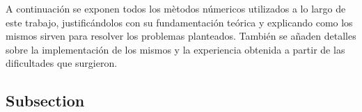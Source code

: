 \par A continuaci\'on se exponen todos los m\`etodos n\'umericos utilizados a
lo largo de este trabajo, justific\'andolos con su fundamentaci\'on te\'orica y
explicando como los mismos sirven para resolver los problemas planteados.
Tambi\'en se a\~naden detalles sobre la implementaci\'on de los mismos y la
experiencia obtenida a partir de las dificultades que surgieron.


\subsection{Subsection}

